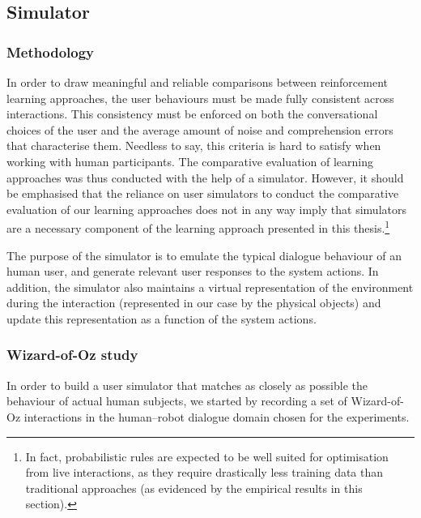 \subsection{Simulator}

\subsubsection*{Methodology}

In order to draw meaningful and reliable comparisons between reinforcement learning approaches, the user behaviours must be made fully consistent across interactions.  This consistency must be enforced on both the conversational choices of the user and the average amount of noise and comprehension errors that characterise them. Needless to say, this criteria is hard to satisfy when working with human participants. The comparative evaluation of learning approaches was thus conducted with the help of a simulator. However, it should be emphasised that the reliance on user simulators to conduct the comparative evaluation of our learning approaches does not in any way imply that simulators are a necessary component of the learning approach presented in this thesis.\footnote{In fact, probabilistic rules are expected to be well suited for optimisation from live interactions, as they require drastically less training data than traditional approaches (as evidenced by the empirical results in this section).}

The purpose of the simulator is to emulate the typical dialogue behaviour of an human user, and generate relevant user responses to the system actions.  In addition, the simulator also maintains a virtual representation of the environment during the interaction (represented in our case by the physical objects) and update this representation as a function of the system actions.


\subsubsection*{Wizard-of-Oz study}

In order to build a user simulator that matches as closely as possible the behaviour of actual human subjects, we started by recording a set of Wizard-of-Oz interactions in the human--robot dialogue domain chosen for the experiments. 

